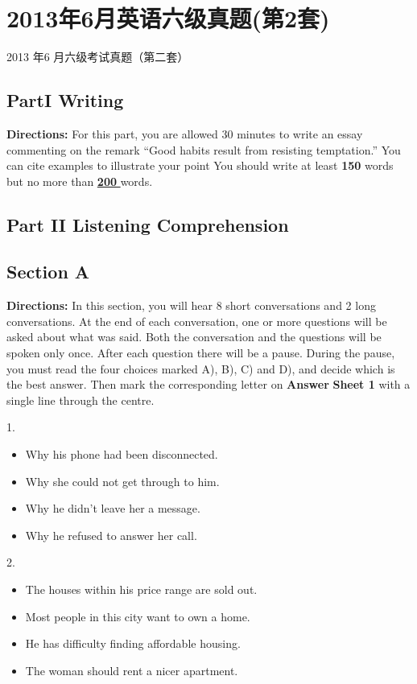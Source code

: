 \documentclass[UTF8,11pt]{ctexart}
\begin{document}
\section*{2013年6月英语六级真题(第2套)}
2013 年6 月六级考试真题（第二套）


\subsection*{\textbf{Part}I \textbf{Writing}}


\textbf{Directions:} For this part, you are allowed 30 minutes to write an essay commenting on the remark “Good habits result from resisting temptation.” You can cite examples to illustrate your point You should write at least\textbf{ 150} words but no more than\textbf{ }\textbf{\uline{200}}\uline{ }words.


\subsection*{\textbf{Part II} \textbf{Listening Comprehension}}


\subsection*{\textbf{Section A}}


\textbf{Directions:} In this section, you will hear 8 short conversations and 2 long conversations. At the end of each conversation, one or more questions will be asked about what was said. Both the conversation and the questions will be spoken only once. After each question there will be a pause. During the pause, you must read the four choices marked A), B), C) and D), and decide which is the best answer. Then mark the corresponding letter on\textbf{ Answer} \textbf{Sheet 1} with a single line through the centre.


1.


\begin{itemize}[leftmargin=2em,itemsep=.2em,topsep=.4em]\item[A.] Why his phone had been disconnected.
\item[B.] Why she could not get through to him.
\item[C.] Why he didn’t leave her a message.
\item[D.] Why he refused to answer her call.
\end{itemize}

2.


\begin{itemize}[leftmargin=2em,itemsep=.2em,topsep=.4em]\item[A.] The houses within his price range are sold out.
\item[B.] Most people in this city want to own a home.
\item[C.] He has difficulty finding affordable housing.
\item[D.] The woman should rent a nicer apartment.
\end{itemize}
\end{document}
